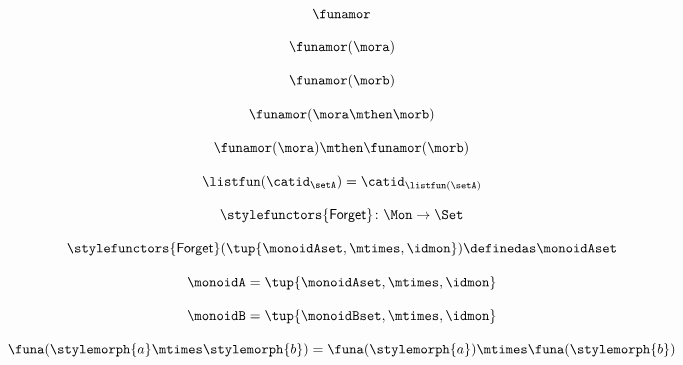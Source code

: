 \begin{forslides}
    \begin{equation}
        \label{eq:slides-translation-08}
        \funamor
    \end{equation}

    \begin{equation}
        \label{eq:slides-translation-09}
        \funamor(\mora)
    \end{equation}

    \begin{equation}
        \label{eq:slides-translation-10}
        \funamor(\morb)
    \end{equation}

    \begin{equation}
        \label{eq:slides-translation-11}
        \funamor(\mora \mthen \morb)
    \end{equation}

    \begin{equation}
        \label{eq:slides-translation-12}
        \funamor (\mora) \mthen \funamor (\morb)
    \end{equation}

    \begin{equation}
        \label{eq:slides-translation-13}
        \listfun(\catid_\setA) = \catid_{\listfun(\setA)}
    \end{equation}

    \begin{equation}
        \label{eq:slides-translation-14}
        \stylefunctors{\mathsf{Forget}} \colon \Mon \to \Set
    \end{equation}

    \begin{equation}
        \label{eq:slides-translation-15}
        \stylefunctors{\mathsf{Forget}}(\tup{{\monoidAset}, \mtimes, \idmon}) \definedas \monoidAset
    \end{equation}

    \begin{equation}
        \label{eq:slides-translation-16}
        \monoidA = \tup{{\monoidAset}, \mtimes, \idmon}
    \end{equation}

    \begin{equation}
        \label{eq:slides-translation-17}
        \monoidB = \tup{{\monoidBset}, \mtimes, \idmon}
    \end{equation}

    \begin{equation}
        \label{eq:slides-translation-18}
        \funa ( \stylemorph{a} \mtimes \stylemorph{b} ) =  \funa(\stylemorph{a}) \mtimes \funa(\stylemorph{b})
    \end{equation}


\end{forslides}
